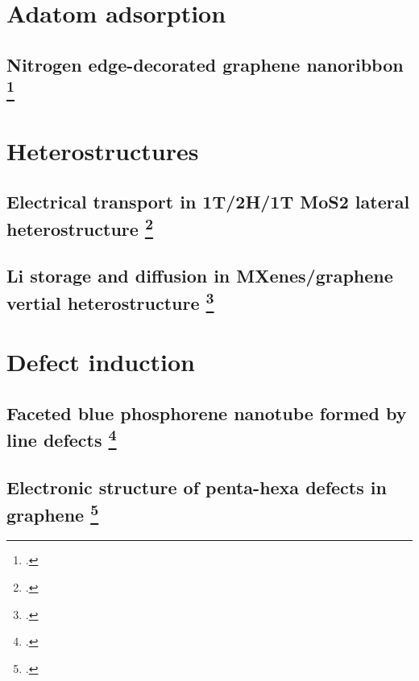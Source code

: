 \section{Adatom adsorption}
\subsection[Nitrogen edge-decorated graphene nanoribbon]{Nitrogen edge-decorated graphene nanoribbon \footcite[This work will be published as:][]{Aierken2017.GNR}}

\section{Heterostructures}
\subsection[Electrical transport in 1T/2H/1T MoS2 lateral heterostructure]{Electrical transport in 1T/2H/1T MoS2 lateral heterostructure \footcite[This work is submitted as:][]{Aierken2017.transport}}
\subsection[Li storage and diffusion in MXenes/graphene vertial heterostructure]{Li storage and diffusion in MXenes/graphene vertial heterostructure \footcite[This work will be published as:][]{Aierken2017.battery}}

\section{Defect induction}
\subsection[Faceted blue phosphorene nanotube formed by line defects]{Faceted blue phosphorene nanotube formed by line defects \footcite[This work is published in:][]{Aierken2015.nanotubes}}
\subsection[Electronic structure of penta-hexa defects in graphene]{Electronic structure of penta-hexa defects in graphene \footcite[This work is published in:][]{Aierken2016.magnetism}}